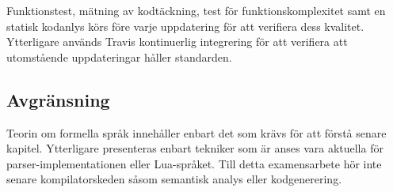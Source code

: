 Funktionstest, mätning av kodtäckning, test för funktionskomplexitet samt en
statisk kodanlys körs före varje uppdatering för att verifiera dess
kvalitet. Ytterligare används Travis kontinuerlig integrering för att
verifiera att utomstående uppdateringar håller standarden.

\subsection{Avgränsning}

Teorin om formella språk innehåller enbart det som krävs för att förstå senare
kapitel. Ytterligare presenteras enbart tekniker som är anses vara aktuella
för parser-implementationen eller Lua-språket. Till detta examensarbete hör
inte senare kompilatorskeden såsom semantisk analys eller kodgenerering.

